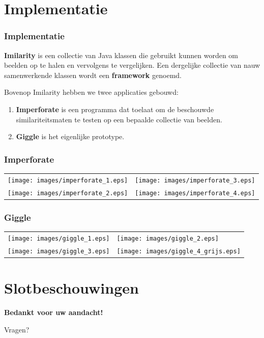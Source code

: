 \documentclass[dutch]{beamer}
\theoremstyle{definition}
\theoremstyle{remark}
\theoremstyle{example}
\begin{document}
\section{Implementatie}
\frame
{
  \frametitle{Implementatie}
  
  \begin{flushleft}
  \textbf{Imilarity} is een collectie van Java klassen die gebruikt kunnen worden om 
  beelden op te halen en vervolgens te vergelijken. Een dergelijke collectie van nauw 
  samenwerkende klassen wordt een \textbf{framework} genoemd. 
  \end{flushleft}
  
  Bovenop Imilarity hebben we twee applicaties gebouwd:
  \begin{enumerate}
    \item \textbf{Imperforate} is een programma dat toelaat om de beschouwde 
    similariteitsmaten te testen op een bepaalde collectie van beelden.
    \item \textbf{Giggle} is het eigenlijke prototype.
  \end{enumerate}
}
\frame
{
  \frametitle{Imperforate}
  
  \centering
  \begin{tabular}{@{}rl@{}}
  \texttt{[image: images/imperforate\_1.eps]} &
  \texttt{[image: images/imperforate\_3.eps]} \vspace{8pt}\\
  \texttt{[image: images/imperforate\_2.eps]} &
  \texttt{[image: images/imperforate\_4.eps]}
  \end{tabular}
}
\frame
{
  \frametitle{Giggle}
  
  \centering
  \begin{tabular}{@{}rl@{}}
  \texttt{[image: images/giggle\_1.eps]} &
  \texttt{[image: images/giggle\_2.eps]} \vspace{8pt}\\
  \texttt{[image: images/giggle\_3.eps]} &
  \texttt{[image: images/giggle\_4\_grijs.eps]}
  \end{tabular}
}

\section{Slotbeschouwingen}



\plainframe
{
  \begin{center}
  \Huge \textbf{\color{white}Bedankt voor uw aandacht!}
  \end{center}
  \vspace{10pt}
  \begin{center}
  \LARGE Vragen?
  \end{center}
}
\end{document}
